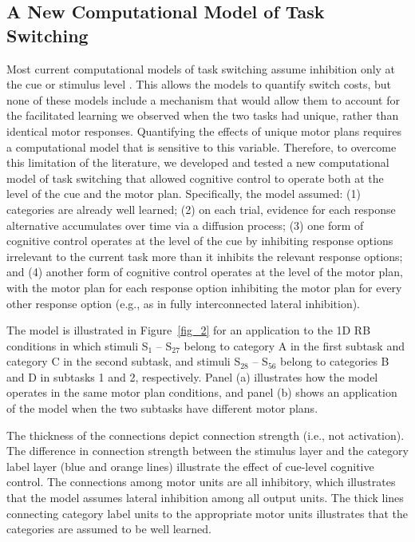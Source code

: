 \documentclass[doc, floatsintext]{apa7}
\begin{document}
\subsection{A New Computational Model of Task Switching}
Most current computational models of task switching assume
inhibition only at the cue or stimulus level
\parencite{botvinick_conflict_2001,
blais_item-specific_2007, verguts_hebbian_2008,
abrahamse_grounding_2016}. This allows the models to
quantify switch costs, but none of these models include a
mechanism that would allow them to account for the
facilitated learning we observed when the two tasks had
unique, rather than identical motor responses. Quantifying
the effects of unique motor plans requires a computational
model that is sensitive to this variable. Therefore, to
overcome this limitation of the literature, we developed and
tested a new computational model of task switching that
allowed cognitive control to operate both at the level of
the cue and the motor plan. Specifically, the model assumed:
(1) categories are already well learned; (2) on each trial,
evidence for each response alternative accumulates over time
via a diffusion process; (3) one form of cognitive control
operates at the level of the cue by inhibiting response
options irrelevant to the current task more than it inhibits
the relevant response options; and (4) another form of
cognitive control operates at the level of the motor plan,
with the motor plan for each response option inhibiting the
motor plan for every other response option (e.g., as in
fully interconnected lateral inhibition).

The model is illustrated in Figure~\ref{fig_2} for an
application to the 1D RB conditions in which stimuli S$_1$
-- S$_{27}$ belong to category A in the first subtask and
category C in the second subtask, and stimuli S$_{28}$ --
S$_{56}$ belong to categories B and D in subtasks 1 and 2,
respectively. Panel (a) illustrates how the model operates
in the same motor plan conditions, and panel (b) shows an
application of the model when the two subtasks have
different motor plans. 

The thickness of the connections depict connection strength
(i.e., not activation). The difference in connection
strength between the stimulus layer and the category label
layer (blue and orange lines) illustrate the effect of
cue-level cognitive control. The connections among motor
units are all inhibitory, which illustrates that the model
assumes lateral inhibition among all output units. The thick
lines connecting category label units to the appropriate
motor units illustrates that the categories are assumed to
be well learned.
\end{document}
